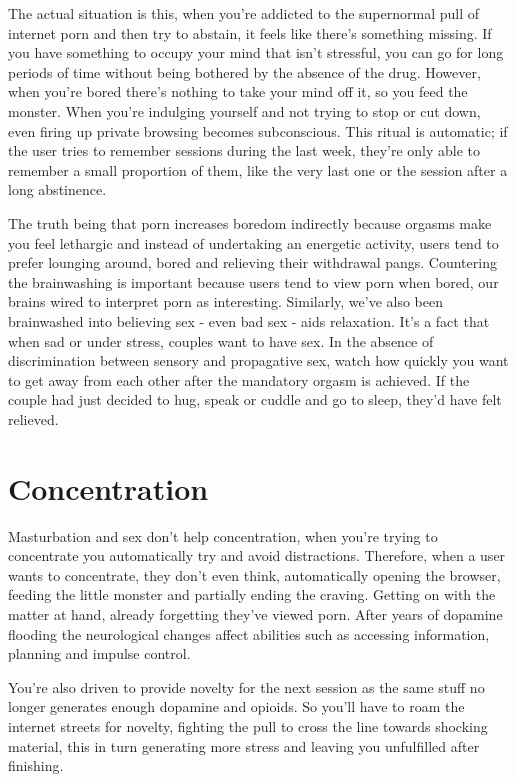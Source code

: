 \documentclass[
]{book}
\begin{document}
The actual situation is this, when you're addicted to the supernormal pull of internet porn and then try to abstain, it feels like there's something missing. If you have something to occupy your mind that isn't stressful, you can go for long periods of time without being bothered by the absence of the drug. However, when you're bored there's nothing to take your mind off it, so you feed the monster. When you're indulging yourself and not trying to stop or cut down, even firing up private browsing becomes subconscious. This ritual is automatic; if the user tries to remember sessions during the last week, they're only able to remember a small proportion of them, like the very last one or the session after a long abstinence.

The truth being that porn increases boredom indirectly because orgasms make you feel lethargic and instead of undertaking an energetic activity, users tend to prefer lounging around, bored and relieving their withdrawal pangs. Countering the brainwashing is important because users tend to view porn when bored, our brains wired to interpret porn as interesting. Similarly, we've also been brainwashed into believing sex - even bad sex - aids relaxation. It's a fact that when sad or under stress, couples want to have sex. In the absence of discrimination between sensory and propagative sex, watch how quickly you want to get away from each other after the mandatory orgasm is achieved. If the couple had just decided to hug, speak or cuddle and go to sleep, they'd have felt relieved.

\hypertarget{concentration}{%
\section{Concentration}\label{concentration}}

Masturbation and sex don't help concentration, when you're trying to concentrate you automatically try and avoid distractions. Therefore, when a user wants to concentrate, they don't even think, automatically opening the browser, feeding the little monster and partially ending the craving. Getting on with the matter at hand, already forgetting they've viewed porn. After years of dopamine flooding the neurological changes affect abilities such as accessing information, planning and impulse control.

You're also driven to provide novelty for the next session as the same stuff no longer generates enough dopamine and opioids. So you'll have to roam the internet streets for novelty, fighting the pull to cross the line towards shocking material, this in turn generating more stress and leaving you unfulfilled after finishing.
\end{document}
